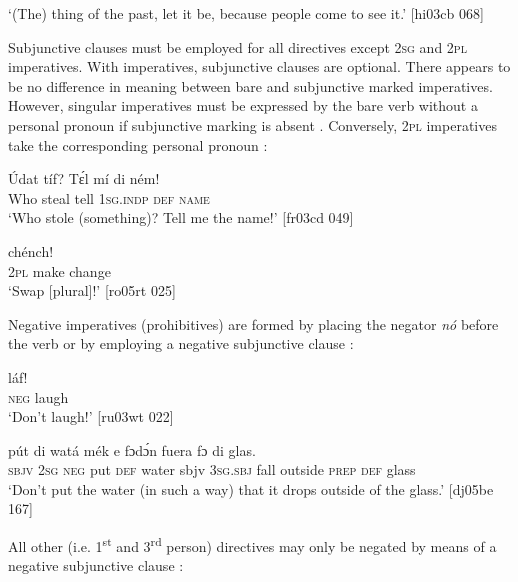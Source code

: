 \glt ‘(The) thing of the past, let it be, because people come to see it.’ [hi03cb 068]
\z

Subjunctive clauses must be employed for all directives except \textsc{2sg} and \textsc{2pl} imperatives. With imperatives, subjunctive clauses are optional. There appears to be no difference in meaning between bare and subjunctive marked imperatives. However, singular imperatives must be expressed by the bare verb without a personal pronoun if subjunctive marking is absent . Conversely, \textsc{2pl} imperatives take the corresponding personal pronoun :


\ea%
    \label{ex:key:431}
    \gll \'{U}dat  tíf?    Tɛ́l  mí    di  ném!\\
Who  steal  tell  \textsc{1sg.indp}  \textsc{def}  \textsc{name}\\

\glt ‘Who stole (something)? Tell me the name!’ [fr03cd 049]
\z


\ea%
    \label{ex:key:432}
    \gll {}        chénch!\\
\textsc{2pl}    make  change\\

\glt ‘Swap [plural]!’ [ro05rt 025]
\z

Negative imperatives (prohibitives) are formed by placing the negator \textit{nó} before the verb  or by employing a negative subjunctive clause : 


\ea%
    \label{ex:key:433}
    \gll {} láf!\\
\textsc{neg}  laugh\\

\glt ‘Don’t laugh!’ [ru03wt 022]
\z


\ea%
    \label{ex:key:434}
    \gll {}        pút  di  watá  mék    e    fɔdɔ́n
fuera  fɔ  di  glas.\\
\textsc{sbjv}    \textsc{2sg}  \textsc{neg}  put  \textsc{def}  water  sbjv    \textsc{3sg.sbj}  fall
outside  \textsc{prep}  \textsc{def}  glass\\

\glt ‘Don’t put the water (in such a way) that it drops outside 
of the glass.’ [dj05be 167]
\z

All other (i.e. 1\textsuperscript{st} and 3\textsuperscript{rd} person) directives may only be negated by means of a negative subjunctive clause :


